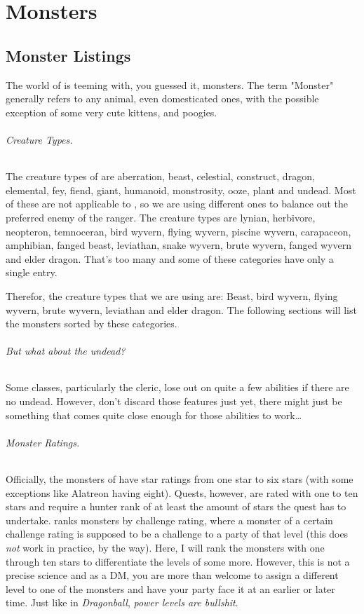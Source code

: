 \renewcommand*{\hbPartCover}{assets/ext/lagiacrus}
\renewcommand*{\hbPartSubcover}{assets/ext/lagiacrus2}
\part{Monsters}

\chapter{Monster Listings}
The world of \MH{} is teeming with, you guessed it, monsters. The term "Monster" generally refers to any animal, even domesticated ones, with the possible exception of some very cute kittens, and poogies.

\paragraph{Creature Types.} The creature types of \DND{} are aberration, beast, celestial, construct, dragon, elemental, fey, fiend, giant, humanoid, monstrosity, ooze, plant and undead. Most of these are not applicable to \MH{}, so we are using different ones to balance out the preferred enemy of the ranger. The \MH{} creature types are lynian, herbivore, neopteron, temnoceran, bird wyvern, flying wyvern, piscine wyvern, carapaceon, amphibian, fanged beast, leviathan, snake wyvern, brute wyvern, fanged wyvern and elder dragon. That's too many and some of these categories have only a single entry.

Therefor, the creature types that we are using are: Beast, bird wyvern, flying wyvern, brute wyvern, leviathan and elder dragon. The following sections will list the monsters sorted by these categories.

\paragraph{But what about the undead?} Some classes, particularly the cleric, lose out on quite a few abilities if there are no undead. However, don't discard those features just yet, there might just be something that comes quite close enough for those abilities to work\ldots

\paragraph{Monster Ratings.} Officially, the monsters of \MH{} have star ratings from one star to six stars (with some exceptions like Alatreon having eight). Quests, however, are rated with one to ten stars and require a hunter rank of at least the amount of stars the quest has to undertake. \DND{} ranks monsters by challenge rating, where a monster of a certain challenge rating is supposed to be a challenge to a party of that level (this does \emph{not} work in practice, by the way). Here, I will rank the monsters with one through ten stars to differentiate the levels of \MH{} some more. However, this is not a precise science and as a DM, you are more than welcome to assign a different level to one of the monsters and have your party face it at an earlier or later time. Just like in \emph{Dragonball}, \emph{power levels are bullshit}.

